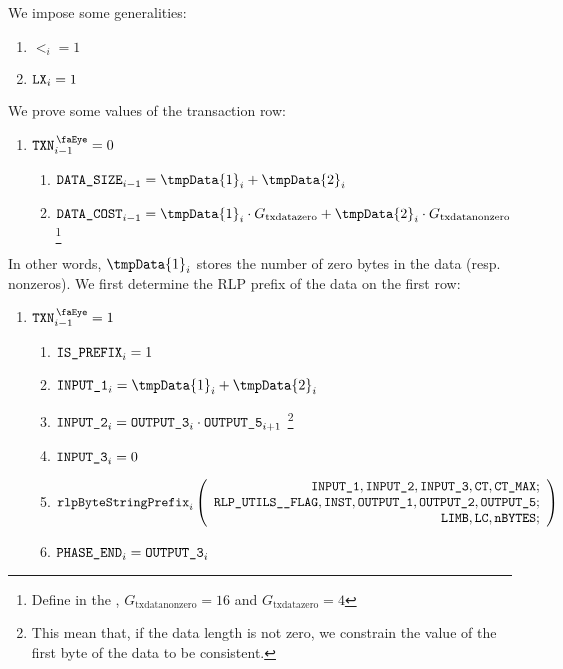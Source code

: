 \begin{center}
\end{center}
We impose some generalities:
\begin{enumerate}
	\item $\lt_{i}=1$
	\item $\texttt{LX}_{i}=1$
\end{enumerate}
We prove some values of the transaction row:
\begin{enumerate}[resume]
	\item \If $\isTxn_{i-1}=0$ \Then
	\begin{enumerate}
		\item $\dataSize_{i-1} = \tmpData{1}_{i} + \tmpData{2}_{i}$
		\item $\dataCost_{i-1} = \tmpData{1}_{i} \cdot G_{\mathrm{txdatazero}} + \tmpData{2}_{i} \cdot G_{\mathrm{txdatanonzero}}$ 
		\footnote{Define in the \cite{EYP-London}, $G_{\mathrm{txdatanonzero}}=16$ and $G_{\mathrm{txdatazero}}=4$}
	\end{enumerate}
\end{enumerate}
In other words, $\tmpData{1}_{i}$ stores the number of zero bytes in the data (resp. nonzeros). 
\newline
We first determine the RLP prefix of the data on the first row:
\begin{enumerate}[resume]
	\item \If $\isTxn_{i-1}=1$ \Then
	\begin{enumerate}
		\item $\texttt{IS\_PREFIX}_{i} = 1$
		\item $\inputColumn{1}_{i} = \tmpData{1}_{i} + \tmpData{2}_{i}$
		\item $\texttt{INPUT\_2}_{i} = \texttt{OUTPUT\_3}_{i} \cdot \texttt{OUTPUT\_5}_{i+1}$
		\footnote{This mean that, if the data length is not zero, we constrain the value of the first byte of the data to be consistent.}
		\item $\texttt{INPUT\_3}_{i} = 0$ 
		\item 
				\[
    			\texttt{rlpByteStringPrefix}_{i}
    			\left(
				\begin{array}{r}
    			\texttt{INPUT\_1},
    			\texttt{INPUT\_2},
    			\texttt{INPUT\_3},
    			\texttt{CT},
    			\texttt{CT\_MAX}; \\
    			\texttt{RLP\_UTILS\_\_FLAG},
    			\texttt{INST},
    			\texttt{OUTPUT\_1},
    			\texttt{OUTPUT\_2},
    			\texttt{OUTPUT\_5}; \\
    			\texttt{LIMB},
    			\texttt{LC},
    			\texttt{nBYTES}; \\
    			\end{array}
				\right)
				\]
		\item $\texttt{PHASE\_END}_{i} = \texttt{OUTPUT\_3}_{i}$
	\end{enumerate}
\end{enumerate}
